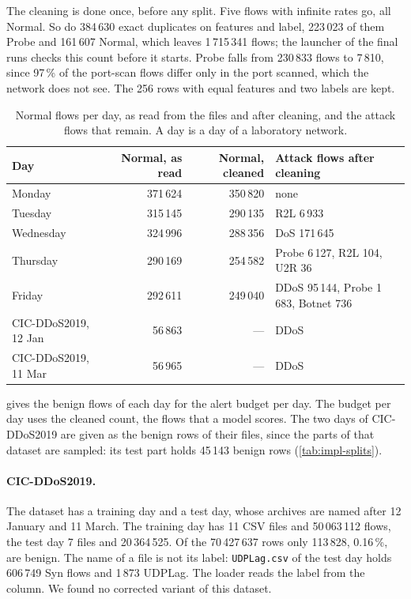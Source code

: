 The cleaning is done once, before any split. Five flows with infinite rates go, all Normal. So
do 384\,630 exact duplicates on features and label, 223\,023 of them Probe and 161\,607
Normal, which leaves 1\,715\,341 flows; the launcher of the final runs checks this count before
it starts. Probe falls from 230\,833 flows to 7\,810, since 97\,\% of the port-scan flows differ
only in the port scanned, which the network does not see. The 256 rows with equal features and
two labels are kept.

\begin{table}[t]
\centering
\footnotesize
\caption{Normal flows per day, as read from the files and after cleaning, and the attack flows
that remain. A day is a day of a laboratory network.}
\label{tab:impl-benign-day}
\setlength{\tabcolsep}{4pt}
\begin{tabular}{@{}lrrp{4.4cm}@{}}
\toprule
Day & Normal, as read & Normal, cleaned & Attack flows after cleaning \\
\midrule
Monday & 371\,624 & 350\,820 & none \\
Tuesday & 315\,145 & 290\,135 & R2L 6\,933 \\
Wednesday & 324\,996 & 288\,356 & DoS 171\,645 \\
Thursday & 290\,169 & 254\,582 & Probe 6\,127, R2L 104, U2R 36 \\
Friday & 292\,611 & 249\,040 & DDoS 95\,144, Probe 1\,683, Botnet 736 \\
\midrule
CIC-DDoS2019, 12 Jan & 56\,863 & --- & DDoS \\
CIC-DDoS2019, 11 Mar & 56\,965 & --- & DDoS \\
\bottomrule
\end{tabular}
\end{table}

 gives the benign flows of each day for the alert budget per day.
The budget per day uses the cleaned count, the flows that a model scores. The two days of
CIC-DDoS2019 are given as the benign rows of their files, since the parts of that dataset are
sampled: its test part holds 45\,143 benign rows (\cref{tab:impl-splits}).

\paragraph{CIC-DDoS2019.}
The dataset \citep{cic2019ddos} has a training day and a test day, whose archives are named
after 12 January and 11 March. The training day has 11 CSV files and 50\,063\,112 flows, the
test day 7 files and 20\,364\,525. Of the
70\,427\,637 rows only 113\,828, 0.16\,\%, are benign. The name of a file is not its label:
\texttt{UDPLag.csv} of the test day holds 606\,749 Syn flows and 1\,873 UDPLag. The loader
reads the label from the column. We found no corrected variant of this dataset.

